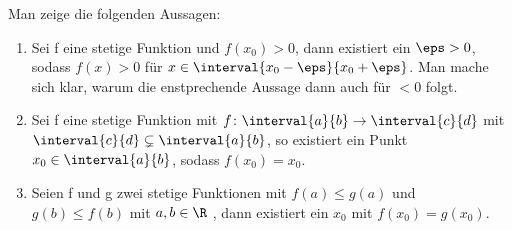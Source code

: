 \begin{exercise}
  Man zeige die folgenden Aussagen:
  \begin{enumerate}[label=(\alph*)]
  \item Sei f eine stetige Funktion und $f(x_0) > 0$, dann existiert ein
    $\eps > 0$, sodass $f(x) > 0$ für $x \in \interval{x_0 - \eps}{x_0 + \eps}$.
    Man mache sich klar, warum die enstprechende Aussage dann auch für $< 0$
    folgt.

  \item Sei f eine stetige Funktion mit
    $f \colon \interval{a}{b} \to \interval{c}{d}$ mit
    $\interval{c}{d} \subsetneq \interval{a}{b}$, so existiert ein Punkt
    $x_0 \in \interval{a}{b}$, sodass $f(x_0)=x_0$.

  \item Seien f und g zwei stetige Funktionen mit $f(a) \leq g(a)$ und
    $g(b) \leq f(b)$ mit $a, b \in \R$ , dann existiert ein $x_0$ mit
    $f(x_0) = g(x_0)$.
  \end{enumerate}
\end{exercise}
